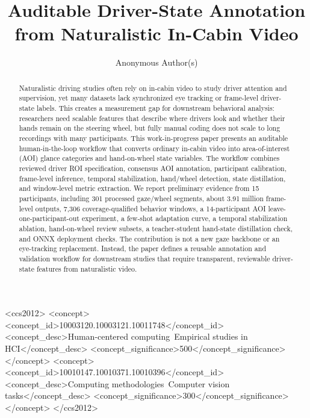 \documentclass[sigconf,review,anonymous]{acmart}
\begin{document}
\title{Auditable Driver-State Annotation from Naturalistic In-Cabin Video}

\author{Anonymous Author(s)}

\begin{abstract}
Naturalistic driving studies often rely on in-cabin video to study driver
attention and supervision, yet many datasets lack synchronized eye
tracking or frame-level driver-state labels. This creates a measurement
gap for downstream behavioral analysis: researchers need scalable
features that describe where drivers look and whether their hands remain
on the steering wheel, but fully manual coding does not scale to long
recordings with many participants. This work-in-progress paper presents
an auditable human-in-the-loop workflow that converts ordinary in-cabin
video into area-of-interest (AOI) glance categories and hand-on-wheel
state variables. The workflow combines reviewed driver ROI
specification, consensus AOI annotation, participant calibration,
frame-level inference, temporal stabilization, hand/wheel detection,
state distillation, and window-level metric extraction. We report
preliminary evidence from 15 participants, including 301 processed
gaze/wheel segments, about 3.91 million frame-level outputs, 7,306
coverage-qualified behavior windows, a 14-participant AOI
leave-one-participant-out experiment, a few-shot adaptation curve, a
temporal stabilization ablation, hand-on-wheel review subsets, a
teacher-student hand-state distillation check, and ONNX deployment
checks. The contribution is not a new gaze backbone or an eye-tracking
replacement. Instead, the paper defines a reusable annotation and
validation workflow for downstream studies that require transparent,
reviewable driver-state features from naturalistic video.
\end{abstract}

\begin{CCSXML}
<ccs2012>
   <concept>
      <concept_id>10003120.10003121.10011748</concept_id>
      <concept_desc>Human-centered computing~Empirical studies in HCI</concept_desc>
      <concept_significance>500</concept_significance>
   </concept>
   <concept>
      <concept_id>10010147.10010371.10010396</concept_id>
      <concept_desc>Computing methodologies~Computer vision tasks</concept_desc>
      <concept_significance>300</concept_significance>
   </concept>
</ccs2012>
\end{CCSXML}
\end{document}
